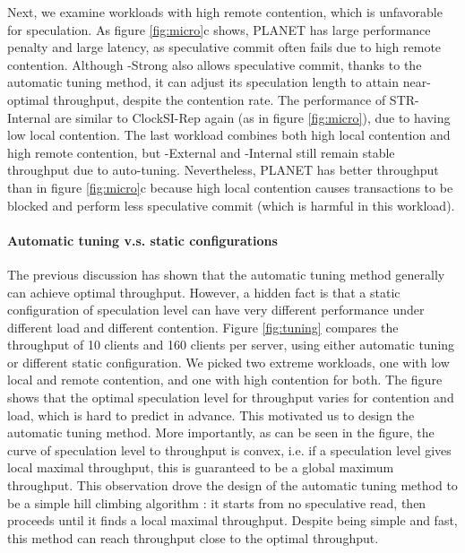 Next, we examine workloads with high remote contention, which is unfavorable for speculation. As figure \ref{fig:micro}c shows, PLANET has large performance penalty and large latency, as speculative commit often fails due to high remote contention. Although {\specula}-Strong also allows speculative commit, thanks to the automatic tuning method, it can adjust its speculation length to attain near-optimal throughput, despite the contention rate. The performance of STR-Internal are similar to ClockSI-Rep again (as in figure \ref{fig:micro}), due to having low local contention. The last workload combines both high local contention and high remote contention, but {\specula}-External and {\specula}-Internal still remain stable throughput due to auto-tuning. Nevertheless, PLANET has better throughput than in figure \ref{fig:micro}c because high local contention causes transactions to be blocked and perform less speculative commit (which is harmful in this workload).

\paragraph{Automatic tuning v.s. static configurations} The previous discussion has shown that the automatic tuning method generally can achieve optimal throughput. However, a hidden fact is that a static configuration of speculation level can have very different performance under different load and different contention. Figure \ref{fig:tuning} compares the throughput of 10 clients and 160 clients per server, using either automatic tuning or different static configuration. We picked two extreme workloads, one with low local and remote contention, and one with high contention for both. The figure shows that the optimal speculation level for throughput varies for contention and load, which is hard to predict in advance. This motivated us to design the automatic tuning method. More importantly, as can be seen in the figure, the curve of speculation level to throughput is convex, i.e. if a speculation level gives local maximal throughput, this is guaranteed to be a global maximum throughput. This observation drove the design of the automatic tuning method to be a simple hill climbing algorithm \cite{hillclimbing}: it starts from no speculative read, then proceeds until it finds a local maximal throughput. Despite being simple and fast, this method can reach throughput close to the optimal throughput.



